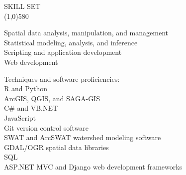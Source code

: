 \documentclass{article}
\begin{document}
\noindent \large{SKILL SET}\\ 
\line(1,0){580}\\
\parbox[t][3cm][t]{0.4\textwidth}{
	\textbullet Spatial data analysis, manipulation, and management\\
	\textbullet Statistical modeling, analysis, and inference\\
	\textbullet Scripting and application development\\
	\textbullet Web development\\
} 
\parbox[t][2.5cm][t]{0.07\textwidth}{\hfil}
\parbox[t][3.2cm][t]{0.45\textwidth}{
	Techniques and software proficiencies:\\
	\small{
		\textbullet R and Python \\%
		\textbullet ArcGIS, QGIS, and SAGA-GIS\\
		\textbullet C\# and VB.NET\\
		\textbullet JavaScript\\
		\textbullet Git version control software\\ %
		\textbullet SWAT and ArcSWAT watershed modeling software\\				\textbullet GDAL/OGR spatial data libraries\\
		\textbullet SQL\\
		\textbullet ASP.NET MVC and Django web development frameworks\\		
	}
}
\end{document}
